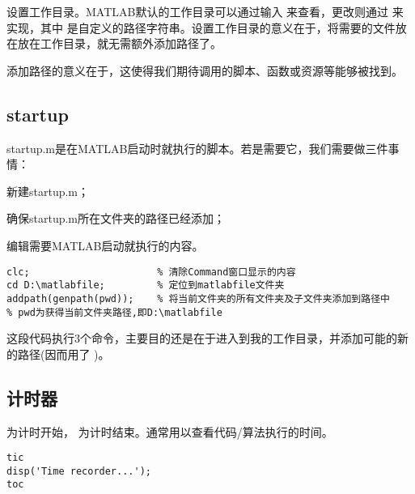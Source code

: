 \item 设置工作目录。MATLAB默认的工作目录可以通过输入  来查看，更改则通过  来实现，其中  是自定义的路径字符串。设置工作目录的意义在于，将需要的文件放在放在工作目录，就无需额外添加路径了。

\myenddot

添加路径的意义在于，这使得我们期待调用的脚本、函数或资源等能够被找到。






\subsection{startup}

startup.m是在MATLAB启动时就执行的脚本。若是需要它，我们需要做三件事情：

\begindot
  \item 新建startup.m；
  \item 确保startup.m所在文件夹的路径已经添加；
  \item 编辑需要MATLAB启动就执行的内容。
\myenddot

\vspace{-0.8cm}
\begin{lstlisting}[caption = 我的startup.m]
clc;                      % 清除Command窗口显示的内容
cd D:\matlabfile;         % 定位到matlabfile文件夹
addpath(genpath(pwd));    % 将当前文件夹的所有文件夹及子文件夹添加到路径中
% pwd为获得当前文件夹路径,即D:\matlabfile
\end{lstlisting}

这段代码执行3个命令，主要目的还是在于进入到我的工作目录，并添加可能的新的路径(因而用了 )。





\subsection{计时器}

 为计时开始， 为计时结束。通常用以查看代码/算法执行的时间。

\vspace{-0.8cm}
\begin{lstlisting}[caption = 计时1]
tic
disp('Time recorder...');
toc
\end{lstlisting}

